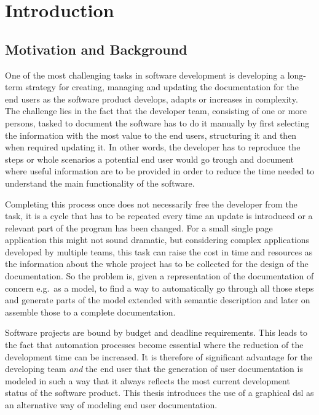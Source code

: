 \chapter{Introduction}
\section{Motivation and Background}
One of the most challenging tasks in software development is developing a long-term strategy for creating, managing and updating the documentation for the end users as the software product develops, adapts or increases in complexity. The challenge lies in the fact that the developer team, consisting of one or more persons, tasked to document the software has to do it manually by first selecting the information with the most value to the end users, structuring it and then when required updating it. In other words, the developer has to reproduce the steps or whole scenarios a potential end user would go trough and document where useful information are to be provided in order to reduce the time needed to understand the main functionality of the software. 

Completing this process once does not necessarily free the developer from the task, it is a cycle that has to be repeated every time an update is introduced or a relevant part of the program has been changed. For a small single page application this might not sound dramatic, but considering complex applications developed by multiple teams, this task can raise the cost in time and resources as the information about the whole project has to be collected for the design of the documentation\cite{5712775}. So the problem is, given a representation of the documentation of concern e.g.\ as a model, to find a way to automatically go through all those steps and generate parts of the model extended with semantic description and later on assemble those to a complete documentation.

Software projects are bound by budget and deadline requirements. This leads to the fact that automation processes become essential where the reduction of the development time can be increased. It is therefore of significant advantage for the developing team \textit{and} the end user that the generation of user documentation is modeled in such a way that it always reflects the most current development status of the software product. This thesis introduces the use of a graphical \acrfull{dsl} as an alternative way of modeling end user documentation.

